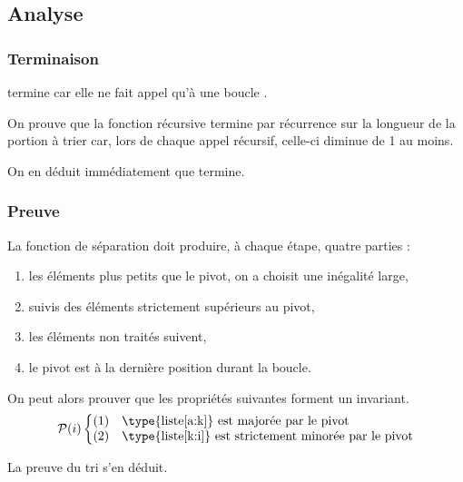 \subsection{Analyse}
\subsubsection{Terminaison}
 termine car elle ne fait appel qu'à une boucle .

On prouve que la fonction récursive  termine par récurrence sur la longueur de la portion à trier car, lors de chaque appel récursif, celle-ci diminue de 1 au moins.

On en déduit immédiatement que  termine.
\subsubsection{Preuve}
La fonction de séparation doit produire, à chaque étape, quatre parties :
\begin{enumerate}
\item les éléments plus petits que le pivot, on a choisit une inégalité large,
\item suivis des éléments strictement supérieurs au pivot,
\item les éléments non traités suivent,
\item le pivot est à la dernière position durant la boucle.
\end{enumerate}
On peut alors prouver que les propriétés suivantes forment un invariant.
\[
{\cal P}(i)\left\{
\begin{matrix}
(1)& \hbox{\type{liste[a:k]} est majorée par le pivot}\hfill\\
(2)& \hbox{\type{liste[k:i]} est strictement minorée par le pivot}\\
\end{matrix}
\right.
\]

La preuve du tri s'en déduit.
